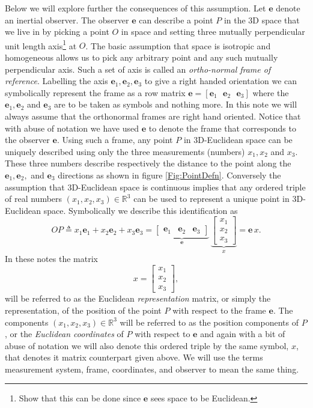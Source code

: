 \documentclass[graybox,envcountchap,sectrefs]{svmonoMuga}
\begin{document}
Below we will explore further the consequences of this assumption.
Let $\mathbf{e}$ denote an inertial observer. The observer $\mathbf{e}$ can describe a point $P$ in the 3D space that we live in by picking a point $O$ in space and setting three mutually perpendicular unit length axis\footnote{Show that this can be done since $\mathbf{e}$ sees space to be Euclidean.} at $O$. The basic assumption that space is isotropic and homogeneous allows us to pick any arbitrary point and any such mutually perpendicular axis. Such a set of axis is called an \textit{ortho-normal frame of reference}. Labelling the axis $\mathbf{e}_1, \mathbf{e}_2, \mathbf{e}_3$ to give a right handed orientation we can symbolically represent the frame as a row matrix 
$\mathbf{e}=[\mathbf{e}_1\:\:\: \mathbf{e}_2\:\:\: \mathbf{e}_3]$ where the $\mathbf{e}_1,\mathbf{e}_2$ and $\mathbf{e}_3$ are to be taken as symbols and nothing more. In this note we will always assume that the orthonormal frames are right hand oriented. Notice that with abuse of notation we have used $\mathbf{e}$ to denote the frame that corresponds to the observer $\mathbf{e}$.
Using such a frame,  any point $P$ in 3D-Euclidean space can be uniquely described using only the three measurements (numbers) $x_1,x_2$ and $x_3$.  These three numbers 
describe respectively the distance to the point along the $\mathbf{e}_1,\mathbf{e}_2,$ and $\mathbf{e}_3$ directions as shown in figure \ref{Fig:PointDefn}. Conversely the assumption that 3D-Euclidean space is continuous implies that any ordered triple of real numbers 
$(x_1,x_2,x_3)\in \mathbb{R}^3$ can be used to represent a unique point in 3D-Euclidean space. Symbolically we describe this identification as
\[
OP \triangleq  x_1\mathbf{e}_1+x_2\mathbf{e}_2+x_3\mathbf{e}_3=\underbrace{\left[ \begin{array}{ccc}\mathbf{e}_1 & \mathbf{e}_2 & \mathbf{e}_3 \end{array} \right]}_{\mathbf{e}} \,\underbrace{\left[ \begin{array}{c} x_1\\x_2\\x_3 \end{array} \right]}_x =\mathbf{e}\,x.
\]
In these notes the matrix
\[
x=\left[ \begin{array}{c} x_1\\x_2\\x_3 \end{array} \right],
\]
will be referred to as the Euclidean \textit{representation} matrix, or simply the representation, of the position of the point $P$ with respect to the frame $\mathbf{e}$. The components $ (x_1,x_2,x_3)\in \mathbb{R}^3$
will be referred to as the position components of $P$, or the \textit{Euclidean coordinates} of $P$  with respect to $\mathbf{e}$ and again with a bit of abuse of notation we will also denote this ordered triple by the same symbol, $x$, that denotes it matrix counterpart given above. We will use the terms measurement system, frame, coordinates, and observer to mean the same thing.
\end{document}

